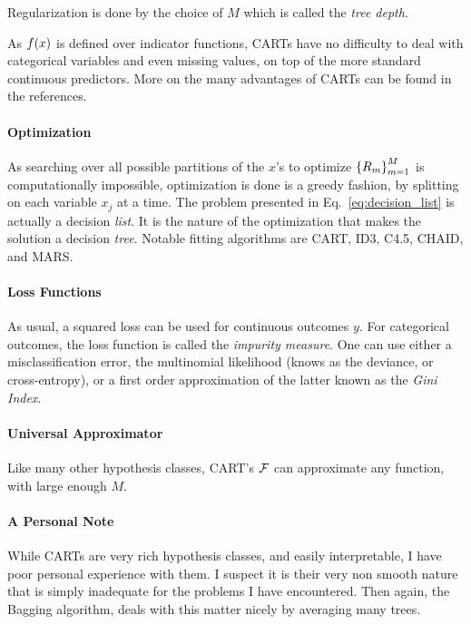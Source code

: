 Regularization is done by the choice of $M$ which is called the \emph{tree depth}.

As $f(x)$ is defined over indicator functions, CARTs have no difficulty to deal with categorical variables and even missing values, on top of the more standard continuous predictors. More on the many advantages of CARTs can be found in the references.

\paragraph{Optimization}
As searching over all possible partitions of the $x$'s to optimize $\left\{ R_m \right\}_{m=1}^M$ is computationally impossible, optimization is done is a greedy fashion, by splitting on each variable $x_j$ at a time.
The problem presented in Eq.~\ref{eq:decision_list} is actually a decision \emph{list}. It is the nature of the optimization that makes the solution a decision \emph{tree}.
Notable fitting algorithms are CART, ID3, C4.5, CHAID, and MARS.


\paragraph{Loss Functions}
As usual, a squared loss can be used for continuous outcomes $y$.
For categorical outcomes, the loss function is called the \emph{impurity measure}.
One can use either a misclassification error, the multinomial likelihood (knows as the deviance, or cross-entropy), or a first order approximation of the latter known as the \emph{Gini Index}.


\paragraph{Universal Approximator}
Like many other hypothesis classes, CART's $\mathcal{F}$ can approximate any function, with large enough $M$.

\paragraph{A Personal Note}
While CARTs are very rich hypothesis classes, and easily interpretable, I have poor personal experience with them. 
I suspect it is their very non smooth nature that is simply inadequate for the problems I have encountered.
Then again, the Bagging algorithm, deals with this matter nicely by averaging many trees.



